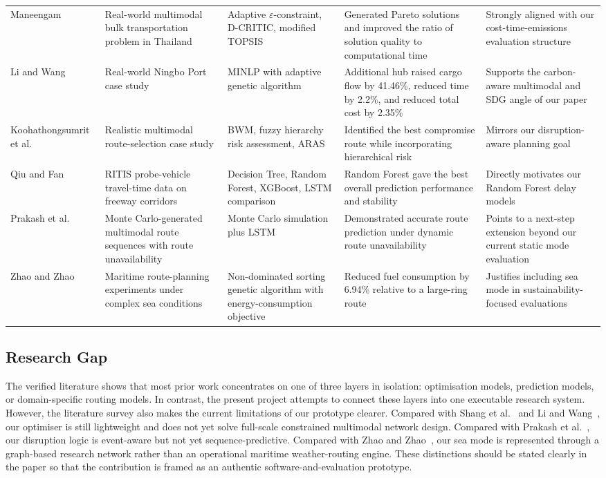 \begin{longtable}{p{2.6cm}p{3.5cm}p{3.6cm}p{3.3cm}p{2.8cm}}
Maneengam~\cite{maneengam2023} & Real-world multimodal bulk transportation problem in Thailand & Adaptive \(\varepsilon\)-constraint, D-CRITIC, modified TOPSIS & Generated Pareto solutions and improved the ratio of solution quality to computational time & Strongly aligned with our cost-time-emissions evaluation structure \\
Li and Wang~\cite{liwang2023} & Real-world Ningbo Port case study & MINLP with adaptive genetic algorithm & Additional hub raised cargo flow by 41.46\%, reduced time by 2.2\%, and reduced total cost by 2.35\% & Supports the carbon-aware multimodal and SDG angle of our paper \\
Koohathongsumrit et al.~\cite{koohathongsumrit2024} & Realistic multimodal route-selection case study & BWM, fuzzy hierarchy risk assessment, ARAS & Identified the best compromise route while incorporating hierarchical risk & Mirrors our disruption-aware planning goal \\
Qiu and Fan~\cite{qiu2021} & RITIS probe-vehicle travel-time data on freeway corridors & Decision Tree, Random Forest, XGBoost, LSTM comparison & Random Forest gave the best overall prediction performance and stability & Directly motivates our Random Forest delay models \\
Prakash et al.~\cite{prakash2024} & Monte Carlo-generated multimodal route sequences with route unavailability & Monte Carlo simulation plus LSTM & Demonstrated accurate route prediction under dynamic route unavailability & Points to a next-step extension beyond our current static mode evaluation \\
Zhao and Zhao~\cite{zhao2024} & Maritime route-planning experiments under complex sea conditions & Non-dominated sorting genetic algorithm with energy-consumption objective & Reduced fuel consumption by 6.94\% relative to a large-ring route & Justifies including sea mode in sustainability-focused evaluations \\
\bottomrule
\end{longtable}

\subsection{Research Gap}
The verified literature shows that most prior work concentrates on one of three layers in isolation: optimisation models, prediction models, or domain-specific routing models. In contrast, the present project attempts to connect these layers into one executable research system. However, the literature survey also makes the current limitations of our prototype clearer. Compared with Shang et al.~\cite{shang2021} and Li and Wang~\cite{liwang2023}, our optimiser is still lightweight and does not yet solve full-scale constrained multimodal network design. Compared with Prakash et al.~\cite{prakash2024}, our disruption logic is event-aware but not yet sequence-predictive. Compared with Zhao and Zhao~\cite{zhao2024}, our sea mode is represented through a graph-based research network rather than an operational maritime weather-routing engine. These distinctions should be stated clearly in the paper so that the contribution is framed as an authentic software-and-evaluation prototype.

